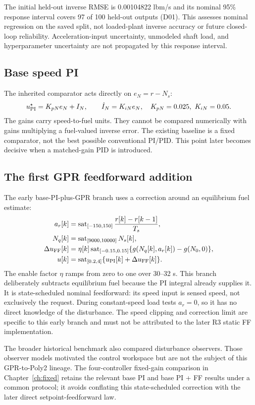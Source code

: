 The initial held-out inverse RMSE is 0.00104822 lbm/s and its nominal 95\% response interval covers 97 of 100 held-out outputs (D01). This assesses nominal regression on the saved split, not loaded-plant inverse accuracy or future closed-loop reliability. Acceleration-input uncertainty, unmodeled shaft load, and hyperparameter uncertainty are not propagated by this response interval.

\subsection{Base speed PI}
The inherited comparator acts directly on $e_N=r-N_s$:
\begin{equation}
u_{\rm PI}^\star=K_{pN}e_N+I_N,\qquad \dot I_N=K_{iN}e_N,
\quad K_{pN}=0.025,\ K_{iN}=0.05.
\end{equation}
The gains carry speed-to-fuel units. They cannot be compared numerically with gains multiplying a fuel-valued inverse error. The existing baseline is a fixed comparator, not the best possible conventional PI/PID. This point later becomes decisive when a matched-gain PID is introduced.

\subsection{The first GPR feedforward addition}
The early base-PI-plus-GPR branch uses a correction around an equilibrium fuel estimate:
\begin{align}
a_r[k]&=\operatorname{sat}_{[-150,150]}\frac{r[k]-r[k-1]}{T_s},\\
N_q[k]&=\operatorname{sat}_{[9000,10000]}N_s[k],\\
\Delta u_{\rm FF}[k]&=\eta[k]\operatorname{sat}_{[-0.15,0.15]}
\{g(N_q[k],a_r[k])-g(N_0,0)\},\\
u[k]&=\operatorname{sat}_{[0.2,4]}\{u_{\rm PI}[k]+\Delta u_{\rm FF}[k]\}.
\end{align}
The enable factor $\eta$ ramps from zero to one over 30--32 s. This branch deliberately subtracts equilibrium fuel because the PI integral already supplies it. It is state-scheduled nominal feedforward: its speed input is sensed speed, not exclusively the request. During constant-speed load tests $a_r=0$, so it has no direct knowledge of the disturbance. The speed clipping and correction limit are specific to this early branch and must not be attributed to the later R3 static FF implementation.

The broader historical benchmark also compared disturbance observers. Those observer models motivated the control workspace but are not the subject of this GPR-to-Poly2 lineage. The four-controller fixed-gain comparison in Chapter~\ref{ch:fixed} retains the relevant base PI and base PI + FF results under a common protocol; it avoids conflating this state-scheduled correction with the later direct setpoint-feedforward law.




